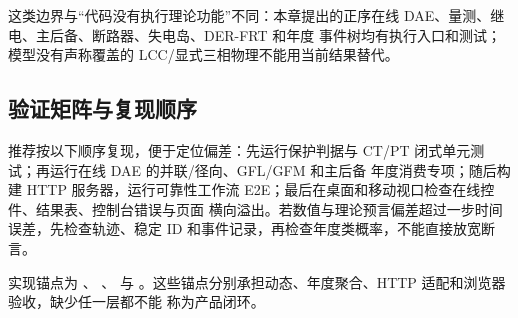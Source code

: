 这类边界与“代码没有执行理论功能”不同：本章提出的正序在线 DAE、量测、继电、主后备、断路器、失电岛、DER-FRT 和年度
事件树均有执行入口和测试；模型没有声称覆盖的 LCC/显式三相物理不能用当前结果替代。

\subsection{验证矩阵与复现顺序}
推荐按以下顺序复现，便于定位偏差：先运行保护判据与 CT/PT 闭式单元测试；再运行在线 DAE 的并联/径向、GFL/GFM 和主后备
年度消费专项；随后构建 HTTP 服务器，运行可靠性工作流 E2E；最后在桌面和移动视口检查在线控件、结果表、控制台错误与页面
横向溢出。若数值与理论预言偏差超过一步时间误差，先检查轨迹、稳定 ID 和事件记录，再检查年度类概率，不能直接放宽断言。

实现锚点为 、
、
 与
。这些锚点分别承担动态、年度聚合、HTTP 适配和浏览器验收，缺少任一层都不能
称为产品闭环。
